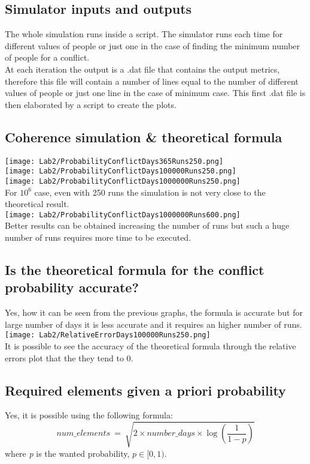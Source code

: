 \documentclass[twocolumn,letterpaper]{report}
\begin{document}
{	\subsection{Simulator inputs and outputs}
			The whole simulation runs inside a script. The simulator runs each time for different values of people or just one in the case of finding the minimum number of people for a conflict. \\
			At each iteration the output is a .dat file that contains the output metrics, therefore this file will contain a number of lines equal to the number of different values of people or just one line in the case of minimum case. This first .dat file is then elaborated by a script to create the plots.
		
		\subsection{Coherence simulation \& theoretical formula}
				\texttt{[image: Lab2/ProbabilityConflictDays365Runs250.png]} \\
				\texttt{[image: Lab2/ProbabilityConflictDays100000Runs250.png]} \\
				\texttt{[image: Lab2/ProbabilityConflictDays1000000Runs250.png]} \\
				For $10^6$ case, even with 250 runs the simulation is not very close to the theoretical result. \\
				\texttt{[image: Lab2/ProbabilityConflictDays1000000Runs600.png]} \\
				Better results can be obtained increasing the number of runs but such a huge number of runs requires more time to be executed.
				
		\subsection{Is the theoretical formula for the conflict probability accurate?}
				Yes, how it can be seen from the previous graphs, the formula is accurate but for large number of days it is less accurate and it requires an higher number of runs.
				\texttt{[image: Lab2/RelativeErrorDays100000Runs250.png]} \\
				It is possible to see the accuracy of the theoretical formula through the relative errors plot that the they tend to 0.
				
				
		\subsection{Required elements given a priori probability}
				Yes, it is possible using the following formula:
				\[
						num\_elements \: = \: \sqrt{2 \times number\_days \times \log{ \left( \frac{1}{1-p} \right) } }
				\]
							where \emph{p} is the wanted probability, $ p \in [0,1)$. \\
							
}
\end{document}
